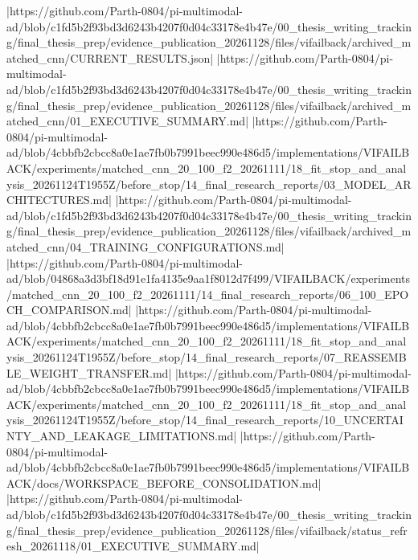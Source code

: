 |https://github.com/Parth-0804/pi-multimodal-ad/blob/c1fd5b2f93bd3d6243b4207f0d04c33178e4b47e/00_thesis_writing_tracking/final_thesis_prep/evidence_publication_20261128/files/vifailback/archived_matched_cnn/CURRENT_RESULTS.json|
|https://github.com/Parth-0804/pi-multimodal-ad/blob/c1fd5b2f93bd3d6243b4207f0d04c33178e4b47e/00_thesis_writing_tracking/final_thesis_prep/evidence_publication_20261128/files/vifailback/archived_matched_cnn/01_EXECUTIVE_SUMMARY.md|
|https://github.com/Parth-0804/pi-multimodal-ad/blob/4cbbfb2cbcc8a0e1ae7fb0b7991beec990e486d5/implementations/VIFAILBACK/experiments/matched_cnn_20_100_f2_20261111/18_fit_stop_and_analysis_20261124T1955Z/before_stop/14_final_research_reports/03_MODEL_ARCHITECTURES.md|
|https://github.com/Parth-0804/pi-multimodal-ad/blob/c1fd5b2f93bd3d6243b4207f0d04c33178e4b47e/00_thesis_writing_tracking/final_thesis_prep/evidence_publication_20261128/files/vifailback/archived_matched_cnn/04_TRAINING_CONFIGURATIONS.md|
|https://github.com/Parth-0804/pi-multimodal-ad/blob/04868a3d3bf18d91e1fa4135e9aa1f8012d7f499/VIFAILBACK/experiments/matched_cnn_20_100_f2_20261111/14_final_research_reports/06_100_EPOCH_COMPARISON.md|
|https://github.com/Parth-0804/pi-multimodal-ad/blob/4cbbfb2cbcc8a0e1ae7fb0b7991beec990e486d5/implementations/VIFAILBACK/experiments/matched_cnn_20_100_f2_20261111/18_fit_stop_and_analysis_20261124T1955Z/before_stop/14_final_research_reports/07_REASSEMBLE_WEIGHT_TRANSFER.md|
|https://github.com/Parth-0804/pi-multimodal-ad/blob/4cbbfb2cbcc8a0e1ae7fb0b7991beec990e486d5/implementations/VIFAILBACK/experiments/matched_cnn_20_100_f2_20261111/18_fit_stop_and_analysis_20261124T1955Z/before_stop/14_final_research_reports/10_UNCERTAINTY_AND_LEAKAGE_LIMITATIONS.md|
|https://github.com/Parth-0804/pi-multimodal-ad/blob/4cbbfb2cbcc8a0e1ae7fb0b7991beec990e486d5/implementations/VIFAILBACK/docs/WORKSPACE_BEFORE_CONSOLIDATION.md|
|https://github.com/Parth-0804/pi-multimodal-ad/blob/c1fd5b2f93bd3d6243b4207f0d04c33178e4b47e/00_thesis_writing_tracking/final_thesis_prep/evidence_publication_20261128/files/vifailback/status_refresh_20261118/01_EXECUTIVE_SUMMARY.md|
